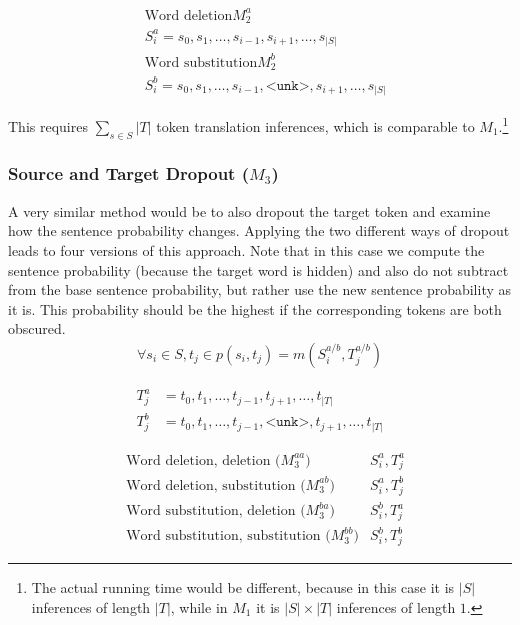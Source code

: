 \vspace{-0.8cm}

\begin{align*}
    & \text{Word deletion} M_2^a \\ 
    & S^{a}_i = s_0, s_1, \ldots, s_{i-1}, s_{i+1}, \ldots, s_{|S|} \\
    & \text{Word substitution} M_2^b \\ 
    & S^{b}_i = s_0, s_1, \ldots, s_{i-1}, \texttt{<unk>}, s_{i+1}, \ldots, s_{|S|}
\end{align*}

This requires $\sum_{s\in S} |T|$ token translation inferences, which is comparable to $M_1$.\footnote{The actual running time would be different, because in this case it is $|S|$ inferences of length $|T|$, while in $M_1$ it is $|S|\times|T|$ inferences of length $1$.}

\subsubsection*{Source and Target Dropout ($M_3$)}

A very similar method would be to also dropout the target token and examine how the sentence probability changes. Applying the two different ways of dropout leads to four versions of this approach. Note that in this case we compute the sentence probability (because the target word is hidden) and also do not subtract from the base sentence probability, but rather use the new sentence probability as it is. This probability should be the highest if the corresponding tokens are both obscured. 
\begin{gather*}
    \forall s_i \in S, t_j \in p(s_i, t_j) = m(S^{a/b}_i , T^{a/b}_j)
\end{gather*}

\vspace{-0.8cm}

\begin{align*}
    T^a_j &= t_0, t_1, \ldots, t_{j-1}, t_{j+1}, \ldots, t_{|T|} \\
    T^b_j &= t_0, t_1, \ldots, t_{j-1}, \texttt{<unk>}, t_{j+1}, \ldots, t_{|T|}
\end{align*}

\vspace{-0.8cm}

\begin{align*}
    & \text{Word deletion, deletion ($M_3^{aa}$)} & S^a_i, T^a_j \\
    & \text{Word deletion, substitution ($M_3^{ab}$)} & S^a_i, T^b_j \\
    & \text{Word substitution, deletion ($M_3^{ba}$)} & S^b_i, T^a_j \\
    & \text{Word substitution, substitution ($M_3^{bb}$)} & S^b_i, T^b_j
\end{align*}

